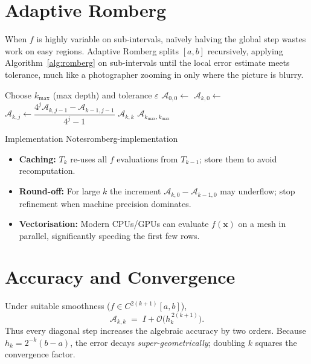 \section{Adaptive Romberg}
When $f$ is highly variable on sub-intervals, naïvely halving the global
step wastes work on easy regions.
Adaptive Romberg splits $[a,b]$ recursively, applying
Algorithm~\ref{alg:romberg} on sub-intervals until
the local error estimate meets tolerance,
much like a photographer zooming in only where the picture is blurry.

\begin{algorithm}[H]
  \caption{Romberg Integration}
  \label{alg:romberg}
  \begin{algorithmic}[1]
    \State Choose $k_{\max}$ (max depth) and tolerance $\varepsilon$
    \State $\mathcal{A}_{0,0} \gets$ 
    \State $\mathcal{A}_{k,0} \gets$ 
    \State $\mathcal{A}_{k,j} \gets \dfrac{4^{j} \mathcal{A}_{k,j-1} - \mathcal{A}_{k-1,j-1}}{4^{j}-1}$
    \EndFor
    \State \Return $\mathcal{A}_{k,k}$ 
    \EndIf
    \EndFor
    \State \Return $\mathcal{A}_{k_{\max},k_{\max}}$
  \end{algorithmic}
\end{algorithm}

\begin{remark}{Implementation Notes}{romberg-implementation}
  \begin{itemize}
    \item \textbf{Caching:}  $T_{k}$ re-uses all $f$ evaluations
          from $T_{k-1}$; store them to avoid recomputation.
    \item \textbf{Round-off:}  For large $k$ the increment
          $\mathcal{A}_{k,0}-\mathcal{A}_{k-1,0}$ may underflow; stop refinement when
          machine precision dominates.
    \item \textbf{Vectorisation:}  Modern CPUs/GPUs can evaluate
          $f(\mathbf{x})$ on a mesh in parallel, significantly speeding
          the first few rows.
  \end{itemize}
\end{remark}

\section{Accuracy and Convergence}
Under suitable smoothness ($f\in C^{2(k+1)}[a,b]$),
\[
  \mathcal{A}_{k,k} \;=\; I + \mathcal{O}\!\bigl(h_k^{\,2(k+1)}\bigr).
\]
Thus every diagonal step increases the algebraic accuracy by two orders.
Because $h_k=2^{-k}(b-a)$, the error decays \emph{super-geometrically}; doubling $k$ squares the convergence factor.

